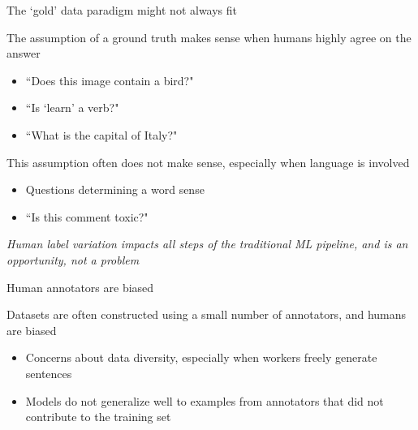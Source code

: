 \documentclass[12pt,aspectratio=169,handout]{beamer}
\begin{document}
\begin{frame}{The `gold' data paradigm might not always fit}

The assumption of a ground truth makes sense when humans highly agree on the answer

\begin{itemize}
	\item ``Does this image contain a bird?"
	\item ``Is `learn' a verb?"
	\item ``What is the capital of Italy?"
\end{itemize}

This assumption often does not make sense, especially when language is involved

\begin{itemize}
	\item Questions determining a word sense
	\item ``Is this comment toxic?"
\end{itemize}

\emph{Human label variation impacts all steps of the traditional ML pipeline, and is an opportunity, not a problem}


\end{frame} \begin{frame}{ Human annotators are biased}

Datasets are often constructed using a small number of annotators, and humans are biased

\begin{itemize}
	\item Concerns about data diversity, especially when workers freely generate sentences
	\item Models do not generalize well to examples from annotators that did not contribute to the training set
\end{itemize}



\end{frame}
\end{document}
